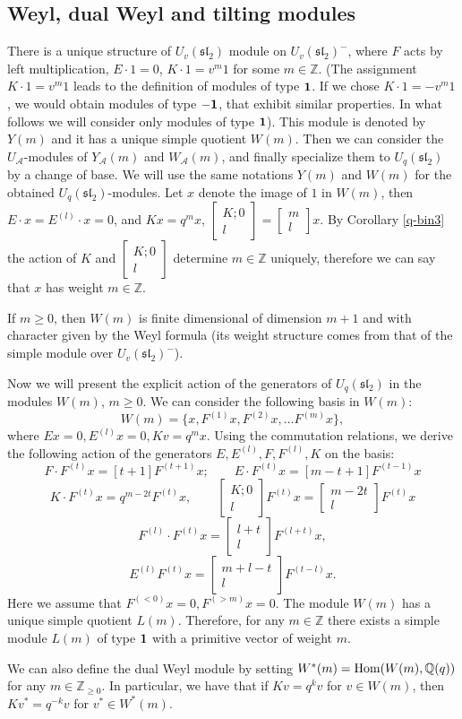 \documentclass[11pt]{amsart}
\newcommand\lie[1]{\mathfrak{#1}}
\newcommand\qbin[2]{\left[  \begin{array}{c}  #1 \\ #2  \end{array}  \right]}
\newcommand{\Z}{\mathbb{Z}}
\newcommand{\Q}{\mathbb{Q}}
\begin{document}
\subsection{Weyl, dual Weyl and tilting modules} \label{modules}
There is a unique structure of  $U_v(\lie{sl}_2)$ module on $U_v(\lie{sl}_2)^-$, where $F$ acts by left multiplication, 
$E\cdot 1 =0$, $K \cdot 1 = v^m 1$ for some $m \in \Z$. (The assignment  $K \cdot 1 =  v^m 1$  leads to the definition of modules of type ${\bf 1}$. If we chose $K \cdot 1 = -v^m 1$, we would obtain modules of type ${\bf -1}$, that exhibit similar properties. In what follows we will consider only modules of type ${\bf 1}$). This module is denoted by $Y(m)$ and it has a unique simple quotient $W(m)$. Then we can consider the $U_{\mathcal A}$-modules of $Y_{\mathcal A}(m)$ and $W_{\mathcal A}(m)$, and finally specialize them to $U_q(\lie{sl}_2)$ by a change of base. We will use the same notations $Y(m)$ and $W(m)$ for the obtained $U_q(\lie{sl}_2)$-modules. Let $x$ denote the image of $1$ in $W(m)$, then  $E \cdot x = E^{(l)} \cdot x =0$, and $K x = q^m x$, $\qbin{K ; 0}{l} = \qbin{m}{l} x$. By Corollary \ref{q-bin3} the action of $K$ and $\qbin{K;0}{l}$ determine $m \in \Z$ uniquely, therefore we can say that $x$ has weight $m \in \Z$. 

If $m \geq 0$, then $W(m)$ is finite dimensional of dimension $m+1$ and with character given by the Weyl formula (its weight structure comes from that of the simple module over $U_v(\lie{sl}_2)^-$). 


Now we will present the explicit action of the generators of $U_q(\lie{sl}_2)$ in the modules $W(m)$, $m \geq 0$. We can consider the following basis in $W(m)$: 
\[   W(m)  = \{ x, F^{(1)}x,  F^{(2)}x,  \ldots  F^{(m)} x \},  \] 
where $E x = 0, E^{(l)} x =0, Kv = q^m x$.  Using the commutation relations, we derive the following action of the generators $E, E^{(l)}, F, F^{(l)}, K$ on the basis: 
\[ F \cdot F^{(t)} x= [ t+1] F^{(t+1)} x ; \quad \quad  E \cdot F^{(t)} x=  [m-t+1] F^{(t-1)} x \] 
\[ K \cdot  F^{(t)} x =  q^{m-2t} F^{(t)} x, \quad \quad \qbin{K ; 0}{l} F^{(t)} x =  \qbin{m-2t}{l} F^{(t)} x \] 
\[ F^{(l)} \cdot F^{(t)} x = \qbin{l+t}{l} F^{(l+t)} x,  \] 
 \[  E^{(l)} F^{(t)} x =  \qbin{m+l-t}{l} F^{(t-l)} x .  \] 
Here we assume that $F^{(<0)}x = 0, F^{(>m)}x =0$. 
The module $W(m)$ has a unique simple quotient $L(m)$. Therefore, for any $m \in \Z$ there exists a simple module $L(m)$ of type ${\bf 1}$ with  a primitive vector of weight $m$. 


We can also define the dual Weyl module by setting $W^*(m) = {\rm Hom}(W(m), \Q(q))$ for any $m \in \mathbb{Z}_{\geq 0}$. In particular, 
we have  that if $Kv = q^k v$ for $v \in W(m)$, then $Kv^* = q^{-k} v$ for $v^* \in W^*(m)$. 
\end{document}
